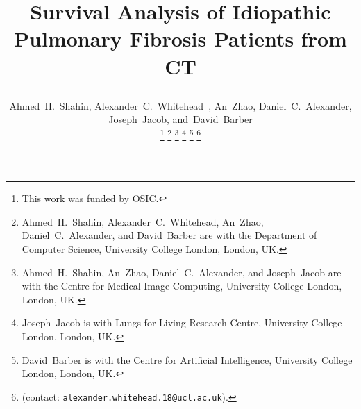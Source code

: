 \documentclass{IEEEtran}
\begin{document}
    \title{
        
        Survival Analysis of Idiopathic Pulmonary Fibrosis Patients from CT
    }
    
    \author{

        Ahmed~H.~Shahin,
        Alexander~C.~Whitehead~,
        An~Zhao,
        Daniel~C.~Alexander,
        Joseph~Jacob,
        and~David~Barber
    

        \thanks{
            This work was funded by \gls{OSIC}.
        }
        \thanks{
            Ahmed~H.~Shahin, Alexander~C.~Whitehead, An~Zhao, Daniel~C.~Alexander, and David~Barber are with the Department of Computer Science, University College London, London, UK.
        }
        \thanks{
            Ahmed~H.~Shahin, An~Zhao, Daniel~C.~Alexander, and Joseph~Jacob are with the Centre for Medical Image Computing, University College London, London, UK.
        }
        \thanks{
            Joseph~Jacob is with Lungs for Living Research Centre, University College London, London, UK.
        }
        \thanks{
            David~Barber is with the Centre for Artificial Intelligence, University College London, London, UK.
        }
        \thanks{
            (contact: \texttt{alexander.whitehead.18@ucl.ac.uk}).
        }
    }
    
    \pagestyle{plain}
    
    \maketitle
    
\end{document}
